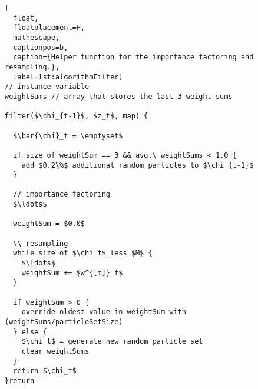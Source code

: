 \begin{lstlisting}[
  float,
  floatplacement=H,
  mathescape,
  captionpos=b,
  caption={Helper function for the importance factoring and resampling.},
  label=lst:algorithmFilter]
// instance variable
weightSums // array that stores the last 3 weight sums

filter($\chi_{t-1}$, $z_t$, map) {

  $\bar{\chi}_t = \emptyset$

  if size of weightSum == 3 && avg.\ weightSums < 1.0 {
    add $0.2\%$ additional random particles to $\chi_{t-1}$
  }

  // importance factoring
  $\ldots$

  weightSum = $0.0$

  \\ resampling
  while size of $\chi_t$ less $M$ {
    $\ldots$
    weightSum += $w^{[m]}_t$
  }

  if weightSum > 0 {
    override oldest value in weightSum with (weightSums/particleSetSize)
  } else {
    $\chi_t$ = generate new random particle set
    clear weightSums
  }
  return $\chi_t$
}return\end{lstlisting}
